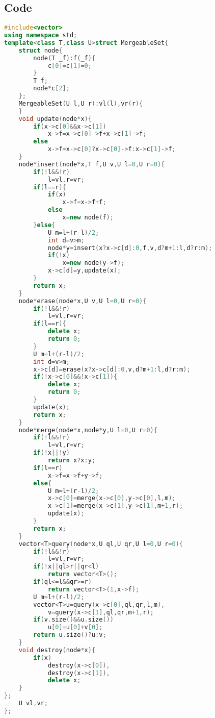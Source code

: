 \documentclass{book}
\begin{document}
\subsection*{Code}
\begin{lstlisting}[language=C++,title={Mergeable Set.hpp (2254 bytes, 91 lines)}]
#include<vector>
using namespace std;
template<class T,class U>struct MergeableSet{
    struct node{
        node(T _f):f(_f){
            c[0]=c[1]=0;
        }
        T f;
        node*c[2];
    };
    MergeableSet(U l,U r):vl(l),vr(r){
    }
    void update(node*x){
        if(x->c[0]&&x->c[1])
            x->f=x->c[0]->f+x->c[1]->f;
        else
            x->f=x->c[0]?x->c[0]->f:x->c[1]->f;
    }
    node*insert(node*x,T f,U v,U l=0,U r=0){
        if(!l&&!r)
            l=vl,r=vr;
        if(l==r){
            if(x)
                x->f=x->f+f;
            else
                x=new node(f);
        }else{
            U m=l+(r-l)/2;
            int d=v>m;
            node*y=insert(x?x->c[d]:0,f,v,d?m+1:l,d?r:m);
            if(!x)
                x=new node(y->f);
            x->c[d]=y,update(x);
        }
        return x;
    }
    node*erase(node*x,U v,U l=0,U r=0){
        if(!l&&!r)
            l=vl,r=vr;
        if(l==r){
            delete x;
            return 0;
        }
        U m=l+(r-l)/2;
        int d=v>m;
        x->c[d]=erase(x?x->c[d]:0,v,d?m+1:l,d?r:m);
        if(!x->c[0]&&!x->c[1]){
            delete x;
            return 0;
        }
        update(x);
        return x;
    }
    node*merge(node*x,node*y,U l=0,U r=0){
        if(!l&&!r)
            l=vl,r=vr;
        if(!x||!y)
            return x?x:y;
        if(l==r)
            x->f=x->f+y->f;
        else{
            U m=l+(r-l)/2;
            x->c[0]=merge(x->c[0],y->c[0],l,m);
            x->c[1]=merge(x->c[1],y->c[1],m+1,r);
            update(x);
        }
        return x;
    }
    vector<T>query(node*x,U ql,U qr,U l=0,U r=0){
        if(!l&&!r)
            l=vl,r=vr;
        if(!x||ql>r||qr<l)
            return vector<T>();
        if(ql<=l&&qr>=r)
            return vector<T>(1,x->f);
        U m=l+(r-l)/2;
        vector<T>u=query(x->c[0],ql,qr,l,m),
            v=query(x->c[1],ql,qr,m+1,r);
        if(v.size()&&u.size())
            u[0]=u[0]+v[0];
        return u.size()?u:v;
    }
    void destroy(node*x){
        if(x)
            destroy(x->c[0]),
            destroy(x->c[1]),
            delete x;
    }
};
    U vl,vr;
};
\end{lstlisting}
\end{document}
